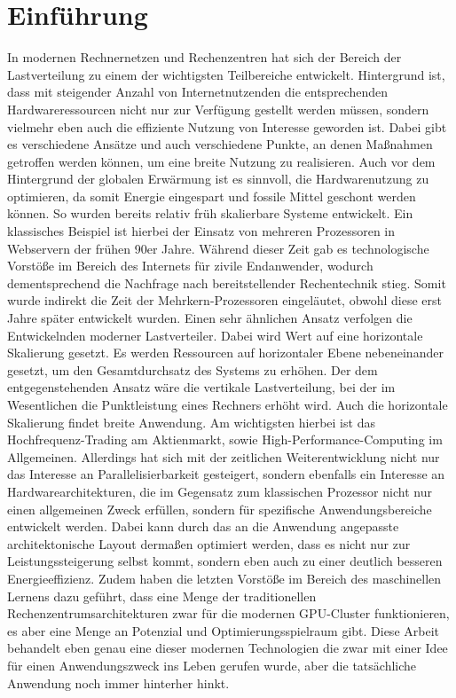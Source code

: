 %
%

\chapter{Einführung}
\label{cha:introduction}

In modernen Rechnernetzen und Rechenzentren hat sich der Bereich der Lastverteilung zu einem der wichtigsten Teilbereiche entwickelt. Hintergrund ist, dass mit steigender Anzahl von Internetnutzenden die entsprechenden Hardwareressourcen nicht nur zur Verfügung gestellt werden müssen, sondern vielmehr eben auch die effiziente Nutzung von Interesse geworden ist. Dabei gibt es verschiedene Ansätze und auch verschiedene Punkte, an denen Maßnahmen getroffen werden können, um eine breite Nutzung zu realisieren. Auch vor dem Hintergrund der globalen Erwärmung ist es sinnvoll, die Hardwarenutzung zu optimieren, da somit Energie eingespart und fossile Mittel geschont werden können. \newline \newline
So wurden bereits relativ früh skalierbare Systeme entwickelt. Ein klassisches Beispiel ist hierbei der Einsatz von mehreren Prozessoren in Webservern der frühen 90er Jahre. Während dieser Zeit gab es technologische Vorstöße im Bereich des Internets für zivile Endanwender, wodurch dementsprechend die Nachfrage nach bereitstellender Rechentechnik stieg. Somit wurde indirekt die Zeit der Mehrkern-Prozessoren eingeläutet, obwohl diese erst Jahre später entwickelt wurden. Einen sehr ähnlichen Ansatz verfolgen die Entwickelnden moderner Lastverteiler. Dabei wird Wert auf eine horizontale Skalierung gesetzt. Es werden Ressourcen auf horizontaler Ebene nebeneinander gesetzt, um den Gesamtdurchsatz des Systems zu erhöhen. Der dem entgegenstehenden Ansatz wäre die vertikale Lastverteilung, bei der im Wesentlichen die Punktleistung eines Rechners erhöht wird. Auch die horizontale Skalierung findet breite Anwendung. Am wichtigsten hierbei ist das Hochfrequenz-Trading am Aktienmarkt, sowie High-Performance-Computing im Allgemeinen. \newline \newline Allerdings hat sich mit der zeitlichen Weiterentwicklung nicht nur das Interesse an Parallelisierbarkeit gesteigert, sondern ebenfalls ein Interesse an Hardwarearchitekturen, die im Gegensatz zum klassischen Prozessor nicht nur einen allgemeinen Zweck erfüllen, sondern für spezifische Anwendungsbereiche entwickelt werden. Dabei kann durch das an die Anwendung angepasste architektonische Layout dermaßen optimiert werden, dass es nicht nur zur Leistungssteigerung selbst kommt, sondern eben auch zu einer deutlich besseren Energieeffizienz. Zudem haben die letzten Vorstöße im Bereich des maschinellen Lernens dazu geführt, dass eine Menge der traditionellen Rechenzentrumsarchitekturen zwar für die modernen GPU-Cluster funktionieren, es aber eine Menge an Potenzial und Optimierungsspielraum gibt. \newline \newline Diese Arbeit behandelt eben genau eine dieser modernen Technologien die zwar mit einer Idee für einen Anwendungszweck ins Leben gerufen wurde, aber die tatsächliche Anwendung noch immer hinterher hinkt.